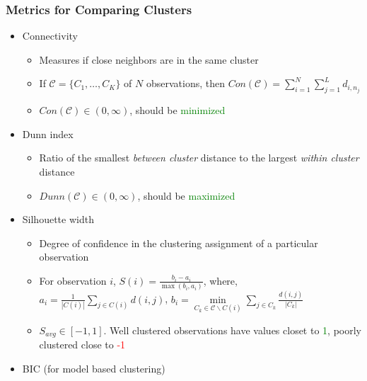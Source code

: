 \documentclass[10pt,dvipsnames,table]{beamer}
\begin{document}
\begin{frame}
\frametitle{Metrics for Comparing Clusters}
\begin{itemize}
\pause \item Connectivity
\begin{itemize}
\item Measures if close neighbors are in the same cluster
\item If $\mathcal{C} = \{C_1, \dots, C_K \}$ of $N$ observations, then $Con(\mathcal{C}) = \sum\limits_{i=1}^{N} \sum\limits_{j=1}^{L} d_{i, n_j}$
\item $Con(\mathcal{C}) \in (0, \infty)$, should be \textcolor{green}{minimized} 
\end{itemize}
\pause \item Dunn index
\begin{itemize}
\item Ratio of the smallest {\emph{between cluster}} distance to the largest {\emph{within cluster}} distance
\item $Dunn(\mathcal{C}) \in (0, \infty)$, should be \textcolor{green}{maximized} 
\end{itemize}
\pause \item Silhouette width
\begin{itemize}
\item Degree of confidence in the clustering assignment of a particular observation
\item For observation $i$, $S(i) = \frac{b_i - a_i}{\max(b_i,a_i)}$, where, $a_i = \frac{1}{|C(i)|}\sum\limits_{j \in C(i)}d(i,j)$, $b_i = \min \limits_{C_k \in \mathcal{C} \backslash C(i) }\sum\limits_{j \in C_k}\frac{d(i,j)}{|C_k|}$
\item $S_{avg} \in [-1, 1]$. Well clustered observations have values closet to \textcolor{green}{1}, poorly clustered close to \textcolor{red}{-1}
\end{itemize}
\pause \item BIC (for model based clustering)
\end{itemize}
\end{frame}
\end{document}
